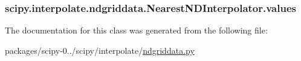 \subsubsection[{values}]{\setlength{\rightskip}{0pt plus 5cm}scipy.\+interpolate.\+ndgriddata.\+Nearest\+N\+D\+Interpolator.\+values}\label{classscipy_1_1interpolate_1_1ndgriddata_1_1NearestNDInterpolator_ad15b2dd987145ee7067ec79dd48ae8af}


The documentation for this class was generated from the following file\+:\begin{DoxyCompactItemize}
\item 
packages/scipy-\/0../scipy/interpolate/\hyperlink{ndgriddata_8py}{ndgriddata.\+py}\end{DoxyCompactItemize}
